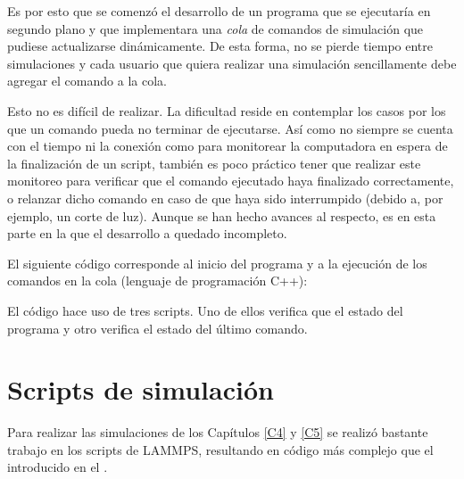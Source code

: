 Es por esto que se comenzó el desarrollo de un programa que se ejecutaría en segundo plano y que implementara una \textit{cola} de comandos de simulación que pudiese actualizarse dinámicamente. De esta forma, no se pierde tiempo entre simulaciones y cada usuario que quiera realizar una simulación sencillamente debe agregar el comando a la cola.

Esto no es difícil de realizar. La dificultad reside en contemplar los casos por los que un comando pueda no terminar de ejecutarse. Así como no siempre se cuenta con el tiempo ni la conexión como para monitorear la computadora en espera de la finalización de un script, también es poco práctico tener que realizar este monitoreo para verificar que el comando ejecutado haya finalizado correctamente, o relanzar dicho comando en caso de que haya sido interrumpido (debido a, por ejemplo, un corte de luz). Aunque se han hecho avances al respecto, es en esta parte en la que el desarrollo a quedado incompleto.

El siguiente código corresponde al inicio del programa y a la ejecución de los comandos en la cola (lenguaje de programación C++):



El código hace uso de tres scripts. Uno de ellos verifica que el estado del programa y otro verifica el estado del último comando.




\section{Scripts de simulación}
\label{AD_Sim}

Para realizar las simulaciones de los Capítulos \ref{C4} y \ref{C5} se realizó bastante trabajo en los scripts de LAMMPS, resultando en código más complejo que el introducido en el .

